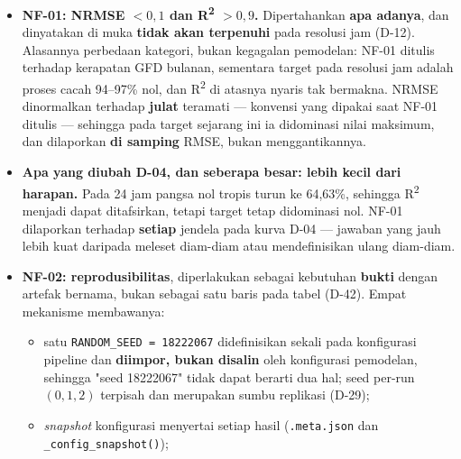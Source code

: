 
\begin{itemize}
    \item \textbf{NF-01: NRMSE $< 0,1$ dan R\textsuperscript{2} $> 0,9$.}
          Dipertahankan \textbf{apa adanya}, dan dinyatakan di muka
          \textbf{tidak akan terpenuhi} pada resolusi jam (D-12). Alasannya
          perbedaan kategori, bukan kegagalan pemodelan: NF-01 ditulis terhadap
          kerapatan GFD bulanan, sementara target pada resolusi jam adalah
          proses cacah 94--97\% nol, dan R\textsuperscript{2} di atasnya nyaris
          tak bermakna. NRMSE dinormalkan terhadap \textbf{julat} teramati ---
          konvensi yang dipakai saat NF-01 ditulis --- sehingga pada target
          sejarang ini ia didominasi nilai maksimum, dan dilaporkan
          \textbf{di samping} RMSE, bukan menggantikannya.
    \item \textbf{Apa yang diubah D-04, dan seberapa besar: lebih kecil dari
          harapan.} Pada 24 jam pangsa nol tropis turun ke 64,63\%, sehingga
          R\textsuperscript{2} menjadi dapat ditafsirkan, tetapi target tetap
          didominasi nol. NF-01 dilaporkan terhadap \textbf{setiap} jendela pada
          kurva D-04 --- jawaban yang jauh lebih kuat daripada meleset diam-diam
          atau mendefinisikan ulang diam-diam.
    \item \textbf{NF-02: reprodusibilitas}, diperlakukan sebagai kebutuhan
          \textbf{bukti} dengan artefak bernama, bukan sebagai satu baris pada
          tabel (D-42). Empat mekanisme membawanya:
          \begin{itemize}
              \item satu \texttt{RANDOM\_SEED = 18222067} didefinisikan sekali
                    pada konfigurasi pipeline dan \textbf{diimpor, bukan
                    disalin} oleh konfigurasi pemodelan, sehingga "seed
                    18222067" tidak dapat berarti dua hal; seed per-run
                    $(0,1,2)$ terpisah dan merupakan sumbu replikasi (D-29);
              \item \textit{snapshot} konfigurasi menyertai setiap hasil
                    (\texttt{.meta.json} dan \texttt{\_config\_snapshot()});

\end{itemize}
\end{itemize}
